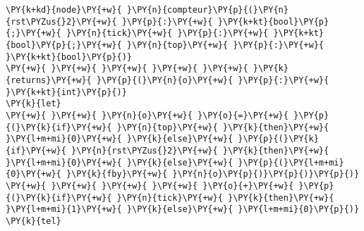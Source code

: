 \begin{Verbatim}[commandchars=\\\{\}]
\PY{k+kd}{node}\PY{+w}{ }\PY{n}{compteur}\PY{p}{(}\PY{n}{rst\PYZus{}2}\PY{+w}{ }\PY{p}{:}\PY{+w}{ }\PY{k+kt}{bool}\PY{p}{;}\PY{+w}{ }\PY{n}{tick}\PY{+w}{ }\PY{p}{:}\PY{+w}{ }\PY{k+kt}{bool}\PY{p}{;}\PY{+w}{ }\PY{n}{top}\PY{+w}{ }\PY{p}{:}\PY{+w}{ }\PY{k+kt}{bool}\PY{p}{)}
\PY{+w}{ }\PY{+w}{ }\PY{+w}{ }\PY{+w}{ }\PY{+w}{ }\PY{k}{returns}\PY{+w}{ }\PY{p}{(}\PY{n}{o}\PY{+w}{ }\PY{p}{:}\PY{+w}{ }\PY{k+kt}{int}\PY{p}{)}
\PY{k}{let}
\PY{+w}{ }\PY{+w}{ }\PY{n}{o}\PY{+w}{ }\PY{o}{=}\PY{+w}{ }\PY{p}{(}\PY{k}{if}\PY{+w}{ }\PY{n}{top}\PY{+w}{ }\PY{k}{then}\PY{+w}{ }\PY{l+m+mi}{0}\PY{+w}{ }\PY{k}{else}\PY{+w}{ }\PY{p}{(}\PY{k}{if}\PY{+w}{ }\PY{n}{rst\PYZus{}2}\PY{+w}{ }\PY{k}{then}\PY{+w}{ }\PY{l+m+mi}{0}\PY{+w}{ }\PY{k}{else}\PY{+w}{ }\PY{p}{(}\PY{l+m+mi}{0}\PY{+w}{ }\PY{k}{fby}\PY{+w}{ }\PY{n}{o}\PY{p}{)}\PY{p}{)}\PY{p}{)}
\PY{+w}{ }\PY{+w}{ }\PY{+w}{ }\PY{+w}{ }\PY{o}{+}\PY{+w}{ }\PY{p}{(}\PY{k}{if}\PY{+w}{ }\PY{n}{tick}\PY{+w}{ }\PY{k}{then}\PY{+w}{ }\PY{l+m+mi}{1}\PY{+w}{ }\PY{k}{else}\PY{+w}{ }\PY{l+m+mi}{0}\PY{p}{)}
\PY{k}{tel}
\end{Verbatim}
